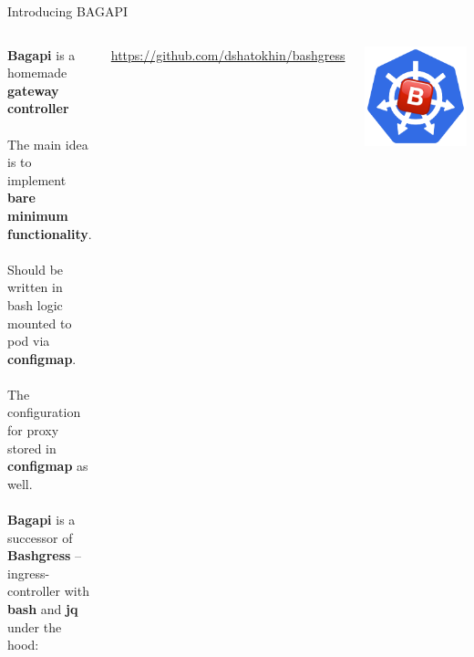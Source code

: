 \documentclass[11pt, aspectratio=169]{beamer}
\begin{document}
\begin{frame}{ Introducing BAGAPI}
	\begin{columns}
		\textbf{Bagapi} is a homemade \textbf{gateway controller}\\~\\
		The main idea is to implement \textbf{bare minimum functionality}.\\~\\
		Should be written in bash logic mounted to pod via \textbf{configmap}.\\~\\

		The configuration for proxy stored in \textbf{configmap} as well.\\~\\

		\textbf{Bagapi} is a successor of \textbf{Bashgress} --
		ingress-controller with \textbf{bash} and \textbf{jq} under the hood:

		\url{https://github.com/dshatokhin/bashgress}

		\includegraphics[width=\textwidth]{bagapi.png}
	\end{columns}
\end{frame}
\end{document}
